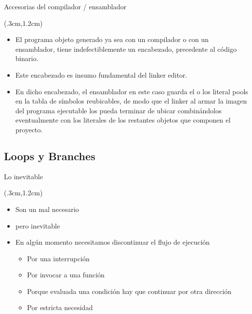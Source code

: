 \documentclass[usenames,table,dvipsnames,aspectratio=169]{beamer}
\begin{document}
\begin{frame}{Accesorias del compilador / ensamblador}
 \begin{textblock*}{\textwidth}(.3cm,1.2cm)
  \begin{itemize}[<+->] \justifying \parskip 0.2cm
   \item El programa objeto generado ya sea con un compilador o con un ensamblador, tiene indefectiblemente un encabezado, precedente al código binario.
   \item Este encabezado es insumo fundamental del linker editor.
   \item En dicho encabezado, el ensamblador en este caso guarda el o los literal pools en la tabla de símbolos reubicables, de modo que el linker al armar la imagen del programa ejecutable los pueda terminar de ubicar combinándolos eventualmente con los literales de los restantes objetos que componen el proyecto.
  \end{itemize}
 \end{textblock*}
\end{frame}

\subsection{Loops y Branches}
\begin{frame}{Lo inevitable}
 \begin{textblock*}{\textwidth}(.3cm,1.2cm)
  \begin{itemize}[<+->]\justifying \parskip 0.2cm
   \item Son un mal necesario
   \item pero inevitable
   \item En algún momento necesitamos discontinuar el flujo de ejecución
   \begin{itemize}
    \item Por una interrupción
    \item Por invocar a una función
    \item Porque evaluada una condición hay que continuar por otra dirección
    \item Por estricta necesidad
   \end{itemize}
  \end{itemize}
 \end{textblock*}
\end{frame}
\end{document}
